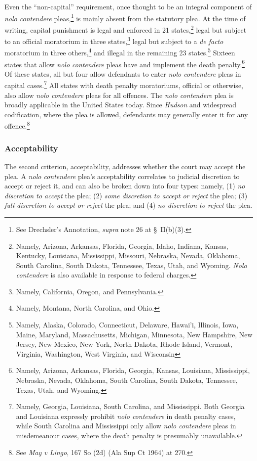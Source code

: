 Even the ``non-capital'' requirement, once thought to be an integral component of \textit{nolo contendere} pleas,\footnote{See Drechsler's Annotation, \textit{supra} note 26 at § II(b)(3).} is mainly absent from the statutory plea. At the time of writing, capital punishment is legal and enforced in 21 states,\footnote{Namely, Arizona, Arkansas, Florida, Georgia, Idaho, Indiana, Kansas, Kentucky, Louisiana, Mississippi, Missouri, Nebraska, Nevada, Oklahoma, South Carolina, South Dakota, Tennessee, Texas, Utah, and Wyoming. \textit{Nolo contendere} is also available in response to federal charges.} legal but subject to an official moratorium in three states,\footnote{Namely, California, Oregon, and Pennsylvania.} legal but subject to a \textit{de facto} moratorium in three others,\footnote{Namely, Montana, North Carolina, and Ohio.} and illegal in the remaining 23 states.\footnote{Namely, Alaska, Colorado, Connecticut, Delaware, Hawai'i, Illinois, Iowa, Maine, Maryland, Massachusetts, Michigan, Minnesota, New Hampshire, New Jersey, New Mexico, New York, North Dakota, Rhode Island, Vermont, Virginia, Washington, West Virginia, and Wisconsin} Sixteen states that allow \textit{nolo contendere} pleas have and implement the death penalty.\footnote{Namely, Arizona, Arkansas, Florida, Georgia, Kansas, Louisiana, Mississippi, Nebraska, Nevada, Oklahoma, South Carolina, South Dakota, Tennessee, Texas, Utah, and Wyoming.}  Of these states, all but four allow defendants to enter \textit{nolo contendere} pleas in capital cases.\footnote{Namely, Georgia, Louisiana, South Carolina, and Mississippi. Both Georgia and Louisiana expressly prohibit \textit{nolo contendere} in death penalty cases, while South Carolina and Mississippi only allow \textit{nolo contendere} pleas in misdemeanour cases, where the death penalty is presumably unavailable.} All states with death penalty moratoriums, official or otherwise, also allow \textit{nolo contendere} pleas for all offences. The \textit{nolo contendere} plea is broadly applicable in the United States today. Since \textit{Hudson} and widespread codification, where the plea is allowed, defendants may generally enter it for any offence.\footnote{See \textit{May v Lingo}, 167 So (2d) (Ala Sup Ct 1964) at 270.}

\subsubsection{Acceptability}

The second criterion, acceptability, addresses whether the court may accept the plea. A \textit{nolo contendere} plea's acceptability correlates to judicial discretion to accept or reject it, and can also be broken down into four types: namely, (1) \textit{no discretion to accept} the plea; (2) \textit{some discretion to accept or reject} the plea; (3) \textit{full discretion to accept or reject} the plea; and (4) \textit{no discretion to reject} the plea.

